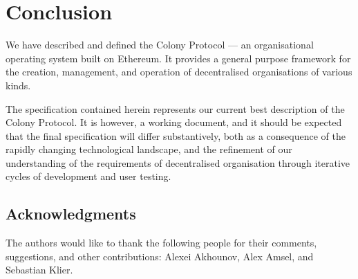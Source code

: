 \section{Conclusion}\label{sec:conclusion}

We have described and defined the Colony Protocol --- an organisational operating system built on Ethereum. It provides a general purpose framework for the creation, management, and operation of decentralised organisations of various kinds.

The specification contained herein represents our current best description of the Colony Protocol. It is however, a working document, and it should be expected that the final specification will differ substantively, both as a consequence of the rapidly changing technological landscape, and the refinement of our understanding of the requirements of decentralised organisation through iterative cycles of development and user testing.

\subsection*{Acknowledgments}


The authors would like to thank the following people for their comments, suggestions, and other contributions: Alexei Akhounov, Alex Amsel, and Sebastian Klier.
